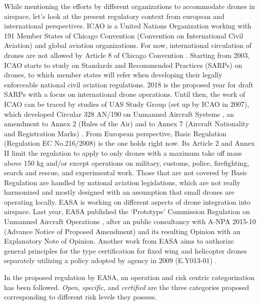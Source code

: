 While mentioning the efforts by different organizations to accommodate drones in airspace, let's look at the present regulatory context from european and international perspectives.
ICAO is a United Nations Organization working with 191 Member States of Chicago Convention (Convention on International Civil Aviation) and global aviation organizations. 
For now, international circulation of drones are not allowed by Article 8 of Chicago Convention \cite{chicagoConvention}. 
Starting from 2003, ICAO starts to study on Standards and Recommended Practices (SARPs) on drones, to which member states will refer when developing their legally enforceable national civil aviation regulations. 
2018 is the proposed year for draft SARPs with a focus on international drone operations. 
Until then, the work of ICAO can be traced by studies of UAS Study Group (set up by ICAO in 2007), which developed Circular 328 AN/190 on Unmanned Aircraft Systems \cite{ICAO_Circular}, an amendment to Annex 2 (Rules of the Air) \cite{amendment43toAnnex2} and to Annex 7 (Aircraft Nationality and Registration Marks) \cite{amendment6toAnnex6}.
From European perspective, Basic Regulation (Regulation EC No.216/2008) \cite{basicRegulation} is the one holds right now. 
Its Article 2 and Annex II limit the regulation to apply to only drones with a maximum take off mass above 150 kg and/or except operations on military, customs, police, firefighting, search and rescue, and experimental work. 
Those that are not covered by Basic Regulation are handled by national aviation legislations, which are not really harmonized and mostly designed with an assumption that small drones are operating locally.
EASA is working on different aspects of drone integration into airspace. 
Last year, EASA published the `Prototype' Commission Regulation on Unmanned Aircraft Operations \cite{prototypeRegulation}, after an public consultancy with A-NPA 2015-10 (Advance Notice of Proposed Amendment) \cite{A_NPA_EASA2015} and its resulting Opinion \cite{technicalOpinion} with an Explanatory Note of Opinion. 
Another work from EASA aims to authorize general principles for the type certification for fixed wing and helicopter drones separately utilizing a policy adopted by agency in 2009 (E.Y013-01) \cite{EY013_01policyStatementAirworthinessCertification}.

In the proposed regulation by EASA, an operation and risk centric categorization has been followed. 
\emph{Open}, \emph{specific}, and \emph{certified} are the three categories proposed corresponding to different risk levels they possess.


